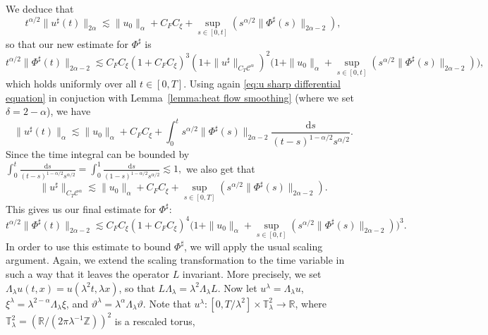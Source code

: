 \documentclass[11pt,a4paper]{article}
\newcommand{\mathd}{\mathrm{d}}
\theoremstyle{remark}
\newcommand{\R}{\mathbb{R}}
\newcommand{\Z}{\mathbb{Z}}
\newcommand{\CC}{\ensuremath{\mathscr{C}}}
\begin{document}
We deduce that
\[
   t^{\alpha /2} \| u^{\sharp} ( t ) \|_{2 \alpha} \lesssim \| u_{0} \|_{\alpha} +C_{F} C_{\xi} + \sup_{s \in [ 0,t ]} ( s^{\alpha /2} \| \Phi^{\sharp} ( s ) \|_{2 \alpha -2} ),
\]
so that our new estimate for $\Phi^{\sharp}$ is
\[
   t^{\alpha /2} \| \Phi^{\sharp} ( t ) \|_{2 \alpha -2} \lesssim C_{F} C_{\xi} ( 1+C_{F} C_{\xi} )^{3} ( 1+ \| u^{\sharp} \|_{C_{T} \CC^\alpha} )^{2} \Big( 1+ \| u_{0} \|_{\alpha} + \sup_{s \in [0,t]} ( s^{\alpha /2} \| \Phi^{\sharp} ( s ) \|_{2 \alpha -2} ) \Big),
\]
which holds uniformly over all $t \in [ 0,T ]$. Using again {\eqref{eq:u sharp differential equation}} in conjuction with Lemma~\ref{lemma:heat flow smoothing} (where we set $\delta =2- \alpha$), we have
\[
   \| u^{\sharp} ( t ) \|_{\alpha} \lesssim \| u_{0} \|_{\alpha} +C_{F} C_{\xi} + \int_{0}^{t} s^{\alpha /2} \| \Phi^{\sharp} ( s ) \|_{2 \alpha -2} \frac{\mathd s}{( t-s )^{1- \alpha /2} s^{\alpha /2}}.
\]
Since the time integral can be bounded by
$
   \int_{0}^{t} \frac{\mathd s}{( t-s )^{1- \alpha /2} s^{\alpha /2}} = \int_{0}^{1} \frac{\mathd s}{( 1-s )^{1- \alpha /2} s^{\alpha /2}} \lesssim 1,
$
we also get that
\begin{equation}\label{eq:pam u sharp uniform alpha bound}
   \| u^{\sharp} \|_{C_{T} \CC^\alpha} \lesssim \| u_{0} \|_{\alpha} +C_{F} C_{\xi} + \sup_{s \in [ 0,T ]} ( s^{\alpha /2} \| \Phi^{\sharp} ( s ) \|_{2 \alpha -2} ) .
\end{equation}
This gives us our final estimate for $\Phi^{\sharp}$:
\begin{equation}\label{eq:pam phi sharp final estimate}
   t^{\alpha /2} \| \Phi^{\sharp} ( t ) \|_{2 \alpha -2} \lesssim C_{F} C_{\xi} ( 1+C_{F} C_{\xi} )^{4} \Big( 1+ \| u_{0} \|_{\alpha} + \sup_{s \in [ 0,t ]} ( s^{\alpha /2} \| \Phi^{\sharp} ( s ) \|_{2 \alpha -2} ) \Big)^{3} .
\end{equation}
In order to use this estimate to bound $\Phi^{\sharp}$, we will apply the
usual scaling argument. Again, we extend the scaling transformation to the
time variable in such a way that it leaves the operator $L$ invariant. More
precisely, we set $\Lambda_{\lambda} u ( t,x ) =u ( \lambda^{2} t, \lambda x)$, so that $L  \Lambda_{\lambda} = \lambda^{2} \Lambda_{\lambda} L$. Now let
$u^{\lambda} = \Lambda_{\lambda} u$, $\xi^{\lambda} = \lambda^{2- \alpha} \Lambda_{\lambda} \xi$, and $\vartheta^{\lambda} = \lambda^{\alpha} \Lambda_{\lambda} \vartheta$. Note that $u^{\lambda} \colon [ 0,T/ \lambda^{2} ] \times \mathbb{T}_{\lambda}^{2} \rightarrow \mathbb{R}$, where
$\mathbb{T}_{\lambda}^{2} = (\R / (2\pi \lambda^{-1} \Z))^{2}$ is a rescaled torus,
\end{document}
